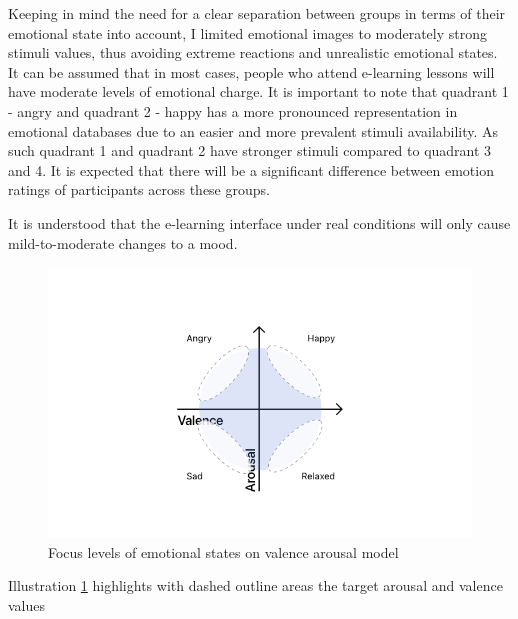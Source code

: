 Keeping in mind the need for a clear separation between groups in terms of their emotional state into account, I limited emotional images to moderately strong stimuli values, thus avoiding extreme reactions and unrealistic emotional states. It can be assumed that in most cases, people who attend e-learning lessons will have moderate levels of emotional charge. It is important to note that quadrant 1 - angry and quadrant 2 - happy has a more pronounced representation in emotional databases due to an easier and more prevalent stimuli availability. As such quadrant 1 and quadrant 2 have stronger stimuli compared to quadrant 3 and 4. It is expected that there will be a significant difference between emotion ratings of participants across these groups.

It is understood that the e-learning interface under real conditions will only cause mild-to-moderate changes to a mood.


\begin{figure}
	\centering
	\includegraphics[width=0.7\linewidth]{graphics/Valence-Arousal-Model-1.png}
	\caption{Focus levels of emotional states on valence arousal model}
	\label{fig:valence-arousal-model-2}
\end{figure}

Illustration \ref{fig:valence-arousal-model-2} highlights with dashed outline areas the target arousal and valence values

